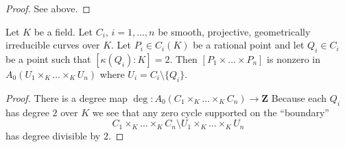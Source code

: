 \begin{proof}
See above.
\end{proof}

\begin{lemma}
\label{lemma-chow-group-product}
Let $K$ be a field.
Let $C_i$, $i = 1, \ldots, n$ be smooth, projective, geometrically irreducible
curves over $K$. Let $P_i \in C_i(K)$ be a rational point and
let $Q_i \in C_i$ be a point such that $[\kappa(Q_i) : K] = 2$.
Then $[P_1 \times \ldots \times P_n]$ is nonzero in
$A_0(U_1 \times_K \ldots \times_K U_n)$ where $U_i = C_i \setminus \{Q_i\}$.
\end{lemma}

\begin{proof}
There is a degree map
$\deg : A_0(C_1 \times_K \ldots \times_K C_n) \to \mathbf{Z}$
Because each $Q_i$ has degree $2$ over $K$ we see that
any zero cycle supported on the ``boundary''
$$
C_1 \times_K \ldots \times_K C_n
\setminus
U_1 \times_K \ldots \times_K U_n
$$
has degree divisible by $2$.
\end{proof}

